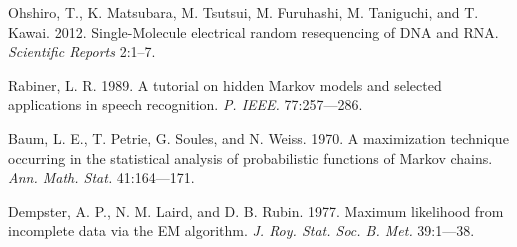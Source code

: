 \documentclass{biophys_letter}
\begin{document}
\begin{thebibliography}{99}
  Ohshiro, T., K. Matsubara, M. Tsutsui, M. Furuhashi, M. Taniguchi, and T. Kawai. 
  2012.
  Single-Molecule electrical random resequencing of DNA and RNA.
  {\it Scientific Reports} 
  2:1--7.

  Rabiner, L. R.
  1989.
  A tutorial on hidden Markov models and selected applications in speech recognition.
  {\it P. IEEE.}
  77:257---286.

  Baum, L. E., T. Petrie, G. Soules, and N. Weiss. 
  1970.
  A maximization technique occurring in the statistical analysis of probabilistic functions of Markov chains.
  {\it Ann. Math. Stat.}
  41:164---171.

  Dempster, A. P., N. M. Laird, and D. B. Rubin.
  1977.
  Maximum likelihood from incomplete data via the EM algorithm.
  {\it J. Roy. Stat. Soc. B. Met.}
  39:1---38.

\end{thebibliography}
\end{document}
